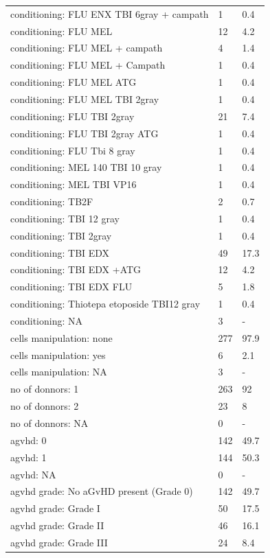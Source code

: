 \documentclass[a4paper,11pt] {article}
\begin{document}
\begin{longtable}{lll}
  conditioning: FLU ENX TBI 6gray + campath & 1 & 0.4 \\ 
  conditioning: FLU MEL & 12 & 4.2 \\ 
  conditioning: FLU MEL + campath & 4 & 1.4 \\ 
  conditioning: FLU MEL + Campath & 1 & 0.4 \\ 
  conditioning: FLU MEL ATG & 1 & 0.4 \\ 
  conditioning: FLU MEL TBI 2gray & 1 & 0.4 \\ 
  conditioning: FLU TBI 2gray & 21 & 7.4 \\ 
  conditioning: FLU TBI 2gray ATG & 1 & 0.4 \\ 
  conditioning: FLU Tbi 8 gray & 1 & 0.4 \\ 
  conditioning: MEL 140 TBI 10 gray & 1 & 0.4 \\ 
  conditioning: MEL TBI VP16 & 1 & 0.4 \\ 
  conditioning: TB2F & 2 & 0.7 \\ 
  conditioning: TBI 12 gray & 1 & 0.4 \\ 
  conditioning: TBI 2gray & 1 & 0.4 \\ 
  conditioning: TBI EDX & 49 & 17.3 \\ 
  conditioning: TBI EDX +ATG & 12 & 4.2 \\ 
  conditioning: TBI EDX FLU & 5 & 1.8 \\ 
  conditioning: Thiotepa etoposide TBI12 gray & 1 & 0.4 \\ 
  conditioning: NA & 3 & - \\ 
  cells manipulation: none & 277 & 97.9 \\ 
  cells manipulation: yes & 6 & 2.1 \\ 
  cells manipulation: NA & 3 & - \\ 
  no of donnors: 1 & 263 & 92 \\ 
  no of donnors: 2 & 23 & 8 \\ 
  no of donnors: NA & 0 & - \\ 
  agvhd: 0 & 142 & 49.7 \\ 
  agvhd: 1 & 144 & 50.3 \\ 
  agvhd: NA & 0 & - \\ 
  agvhd grade: No aGvHD present (Grade 0) & 142 & 49.7 \\ 
  agvhd grade: Grade I & 50 & 17.5 \\ 
  agvhd grade: Grade II & 46 & 16.1 \\ 
  agvhd grade: Grade III & 24 & 8.4 \\ 

\end{longtable}
\end{document}
